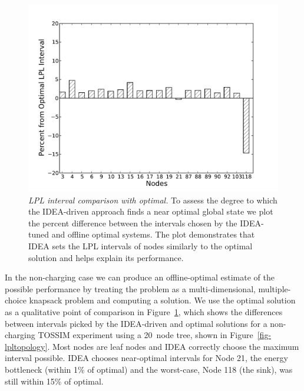 \documentclass{sig-alternate}
\begin{document}
\begin{figure}[t]
\begin{center}
\includegraphics[width=\hsize]{./figs/graph_lpl_interval_comparison.pdf}
\end{center}

\caption{\textit{LPL interval comparison with optimal.} To assess the degree
to which the IDEA-driven approach finds a near optimal global state we plot
the percent difference between the intervals chosen by the IDEA-tuned and
offline optimal systems. The plot demonstrates that IDEA sets the LPL
intervals of nodes similarly to the optimal solution and helps explain its
performance.}

\label{fig-intervalvoptimal}
\end{figure}

In the non-charging case we can produce an offline-optimal estimate of the
possible performance by treating the problem as a multi-dimensional,
multiple-choice knapsack problem and computing a solution. We use the optimal
solution as a qualitative point of comparison in
Figure~\ref{fig-intervalvoptimal}, which shows the differences between
intervals picked by the IDEA-driven and optimal solutions for a non-charging
TOSSIM experiment using a 20~node tree, shown in
Figure~\ref{fig-lpltopology}. Most nodes are leaf nodes and IDEA correctly
choose the maximum interval possible. IDEA chooses near-optimal intervals for
Node 21, the energy bottleneck (within 1\% of optimal) and the worst-case,
Node 118 (the sink), was still within 15\% of optimal.
\end{document}
